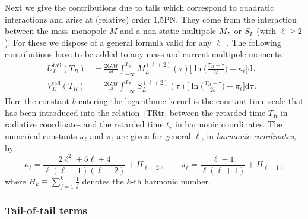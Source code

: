 \documentclass[prd,preprint,superscriptaddress,tightenlines,nofootinbib,
  eqsecnum,showpacs]{revtex4}
\newcommand{\ud}{\mathrm{d}}
\begin{document}
Next we give the contributions due to tails which correspond to
quadratic interactions and arise at (relative) order 1.5PN. They come
from the interaction between the mass monopole $M$ and a non-static
multipole $M_L$ or $S_L$ (with $\ell\geqslant 2$). For these we
dispose of a general formula valid for any $\ell$~\cite{BD92,
  B95}. The following contributions have to be added to any mass and
current multipole moments:
%
\begin{subequations}
\begin{align}
U_L^\text{tail}(T_R) &= \frac{2 G M}{c^3} \int_{-\infty}^{T_R}
M_L^{(\ell+2)} (\tau) \bigg[ \ln\bigg(\frac{T_R-\tau}{2b}\bigg) +
  \kappa_\ell \bigg] \ud \tau \,,\\ V_L^\text{tail}(T_R) &=
\frac{2 G M}{c^3} \int_{-\infty}^{T_R} S_L^{(\ell+2)} (\tau) \bigg[
  \ln \bigg(\frac{T_R-\tau}{2b} \bigg) + \pi_\ell \bigg] \ud \tau\,.
\end{align}
\end{subequations}
%
Here the constant $b$ entering the logarithmic kernel is the constant
time scale that has been introduced into the relation~\eqref{TRtr}
between the retarded time $T_R$ in radiative coordinates and the
retarded time $t_r$ in harmonic coordinates. The numerical constants
$\kappa_\ell$ and $\pi_\ell$ are given for general $\ell$, in
\textit{harmonic coordinates}, by
%
\begin{equation}\label{pikappa}
    \kappa_\ell = \frac{2\ell^2+5\ell+4}{\ell(\ell+1)(\ell+2)} +
    H_{\ell-2}\,,\qquad \pi_\ell = \frac{\ell-1}{\ell(\ell+1)} +
    H_{\ell-1}\,,
\end{equation}
%
where $H_k \equiv \sum_{j=1}^k \frac{1}{j}$ denotes the $k$-th
harmonic number.

\subsubsection{Tail-of-tail terms}
\label{sec:tail2}
\end{document}
